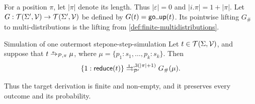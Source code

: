For a position \(\pi\), let \(|\pi|\) denote its length.  Thus
\(|\varepsilon|=0\) and \(|i.\pi|=1+|\pi|\).  Let
\(G:\mathcal{T}\!\left(\Sigma',\mathcal{V}\right)\to\mathcal{T}\!\left(\Sigma',\mathcal{V}\right)\) be defined by
\(G(t)=\tgoup(t)\).  Its pointwise lifting \(G_{\#}\) to
multi-distributions is the lifting from
\cref{def:finite-multidistributions}.

\begin{Lemma}{Simulation of one outermost step}{one-step-simulation}
  Let \(t\in\mathcal{T}\!\left(\Sigma,\mathcal{V}\right)\), and suppose that
  \(t\oto_{\P,\pi}\mu\), where
  \(\mu=\{p_1:s_1,\ldots,p_k:s_k\}\).  Then
  \[
    \{1:\treduce(t)\}
      \iliftto_{\P'}^{,3(|\pi|+1)}
      G_{\#}(\mu).
  \]
\end{Lemma}

Thus the target derivation is finite and non-empty, and it preserves every
outcome and its probability.

